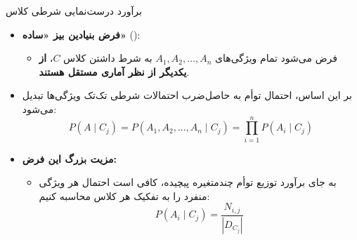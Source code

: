 \begin{frame}{برآورد درست‌نمایی شرطی کلاس}{}
  \begin{itemize}
    \setlength{\itemsep}{8pt}
    \item \textbf{فرض بنیادین بیز «ساده»} ():
    \begin{itemize}
      \item فرض می‌شود تمام ویژگی‌های $A_1, A_2, \dots, A_n$ به شرط داشتن کلاس $C$، \textbf{از یکدیگر از نظر آماری مستقل هستند}.
    \end{itemize}
    \item بر این اساس، احتمال توأم به حاصل‌ضرب احتمالات شرطی تک‌تک ویژگی‌ها تبدیل می‌شود:
    \[
      P(A \mid C_j) = P(A_1, A_2, \dots, A_n \mid C_j) = \prod_{i=1}^{n} P(A_i \mid C_j)
    \]
    \item \textbf{مزیت بزرگ این فرض:}
    \begin{itemize}
      \item به جای برآورد توزیع توأم چندمتغیره پیچیده، کافی است احتمال هر ویژگی منفرد را به تفکیک هر کلاس محاسبه کنیم:
      \[
        P(A_i \mid C_j) = \frac{N_{i,j}}{|D_{C_j}|}
      \]
    \end{itemize}
  \end{itemize}
\end{frame}

